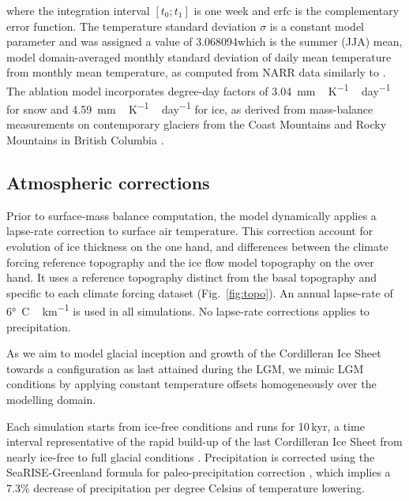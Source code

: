 where the integration interval $[t_0; t_1]$ is one week and $\mathrm{erfc}$ is the complementary error function. The temperature standard deviation $\sigma$ is a constant model parameter and was assigned a value of 3.068094\degC which is the summer (JJA) mean, model domain-averaged monthly standard deviation of daily mean temperature from monthly mean temperature, as computed from NARR data similarly to \citet{seguinot-inreview}. The ablation model incorporates degree-day factors of 3.04~\unit{mm\,K^{-1}\,day^{-1}} for snow and 4.59~\unit{mm\,K^{-1}\,day^{-1}} for ice, as derived from mass-balance measurements on contemporary glaciers from the Coast Mountains and Rocky Mountains in British Columbia \citep{shea-etal-2009}.

\subsection{Atmospheric corrections}

Prior to surface-mass balance computation, the model dynamically applies a lapse-rate correction to surface air temperature. This correction account for evolution of ice thickness on the one hand, and differences between the climate forcing reference topography and the ice flow model topography on the over hand. It uses a reference topography distinct from the basal topography and specific to each climate forcing dataset (Fig.~\ref{fig:topo}). An annual lapse-rate of 6\unit{\degree C\,km^{-1}} is used in all simulations. No lapse-rate corrections applies to precipitation.

As we aim to model glacial inception and growth of the Cordilleran Ice Sheet towards a configuration as last attained during the LGM, we mimic LGM conditions by applying constant temperature offsets homogeneously over the modelling domain. 

Each simulation starts from ice-free conditions and runs for 10\,kyr, a time interval representative of the rapid build-up of the last Cordilleran Ice Sheet from nearly ice-free to full glacial conditions \citep{clague-1989,stroeven-etal-2010}. Precipitation is corrected using the SeaRISE-Greenland formula for paleo-precipitation correction \citep{huybrechts-2002}, which implies a 7.3\% decrease of precipitation per degree Celsius of temperature lowering.

